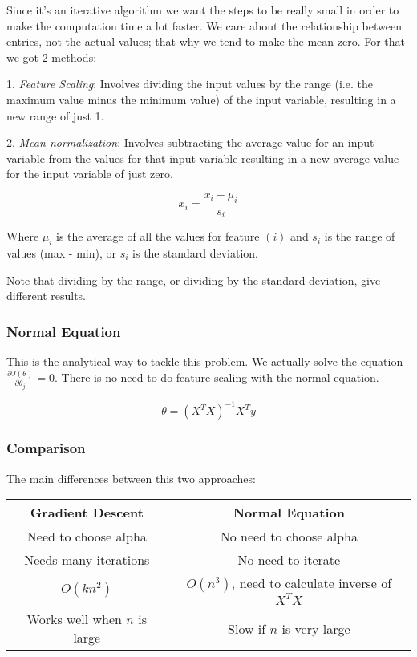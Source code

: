Since it's an iterative algorithm we want the steps to be really small in order to make the computation time a lot faster. We care about the relationship between entries, not the actual values; that why we tend to make the mean zero. For that we got 2 methods:

1. \textit{Feature Scaling}: Involves dividing the input values by the range (i.e. the maximum value minus the minimum value) of the input variable, resulting in a new range of just 1.

2. \textit{Mean normalization}: Involves subtracting the average value for an input variable from the values for that input variable resulting in a new average value for the input variable of just zero.

$$x_i = \frac{x_i - \mu_i}{s_i}$$

Where $\mu_i$ is the average of all the values for feature $(i)$ and $s_i$ is the range of values (max - min), or $s_i$ is the standard deviation.

Note that dividing by the range, or dividing by the standard deviation, give different results. 

\subsubsection{Normal Equation}
This is the analytical way to tackle this problem. We actually solve the equation $\frac{\partial{J(\theta)}}{\partial{\theta_{j}}} = 0$. There is no need to do feature scaling with the normal equation.

$$\theta = (X^TX)^{-1}X^Ty$$


\subsubsection{Comparison}
The main differences between this two approaches:


\begin{center}
\begin{tabular}{ |c|c| } 
\hline
\textbf{Gradient Descent} & \textbf{Normal Equation} \\
\hline
Need to choose alpha & No need to choose alpha \\
\hline
Needs many iterations & No need to iterate \\
\hline
$O(kn^2)$ & $O(n^3)$, need to calculate inverse of $X^TX$ \\
\hline
Works well when $n$ is large & Slow if $n$ is very large \\
\hline
\end{tabular}
\end{center}

